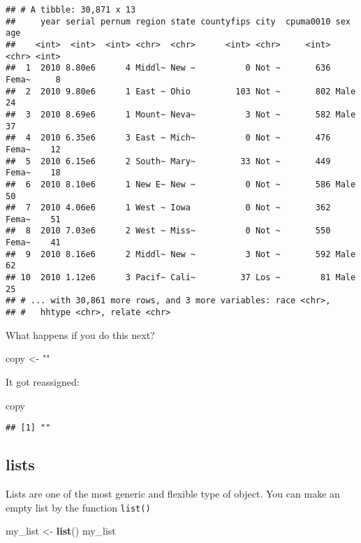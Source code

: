 \documentclass[]{book}
\newenvironment{Shaded}{\begin{snugshade}}{\end{snugshade}}
\newcommand{\KeywordTok}[1]{\textcolor[rgb]{0.13,0.29,0.53}{\textbf{#1}}}
\newcommand{\StringTok}[1]{\textcolor[rgb]{0.31,0.60,0.02}{#1}}
\newcommand{\NormalTok}[1]{#1}
\theoremstyle{definition}
\theoremstyle{definition}
\theoremstyle{definition}
\theoremstyle{remark}
\begin{document}
\begin{verbatim}
## # A tibble: 30,871 x 13
##     year serial pernum region state countyfips city  cpuma0010 sex     age
##    <int>  <int>  <int> <chr>  <chr>      <int> <chr>     <int> <chr> <int>
##  1  2010 8.80e6      4 Middl~ New ~          0 Not ~       636 Fema~     8
##  2  2010 9.80e6      1 East ~ Ohio         103 Not ~       802 Male     24
##  3  2010 8.69e6      1 Mount~ Neva~          3 Not ~       582 Male     37
##  4  2010 6.35e6      3 East ~ Mich~          0 Not ~       476 Fema~    12
##  5  2010 6.15e6      2 South~ Mary~         33 Not ~       449 Fema~    18
##  6  2010 8.10e6      1 New E~ New ~          0 Not ~       586 Male     50
##  7  2010 4.06e6      1 West ~ Iowa           0 Not ~       362 Fema~    51
##  8  2010 7.03e6      2 West ~ Miss~          0 Not ~       550 Fema~    41
##  9  2010 8.16e6      2 Middl~ New ~          3 Not ~       592 Male     62
## 10  2010 1.12e6      3 Pacif~ Cali~         37 Los ~        81 Male     25
## # ... with 30,861 more rows, and 3 more variables: race <chr>,
## #   hhtype <chr>, relate <chr>
\end{verbatim}

What happens if you do this next?

\begin{Shaded}
\begin{Highlighting}[]
\NormalTok{copy <-}\StringTok{ ""}
\end{Highlighting}
\end{Shaded}

It got reassigned:

\begin{Shaded}
\begin{Highlighting}[]
\NormalTok{copy}
\end{Highlighting}
\end{Shaded}

\begin{verbatim}
## [1] ""
\end{verbatim}

\subsection{lists}\label{lists}

Lists are one of the most generic and flexible type of object. You can
make an empty list by the function \texttt{list()}

\begin{Shaded}
\begin{Highlighting}[]
\NormalTok{my_list <-}\StringTok{ }\KeywordTok{list}\NormalTok{()}
\NormalTok{my_list}
\end{Highlighting}
\end{Shaded}
\end{document}
